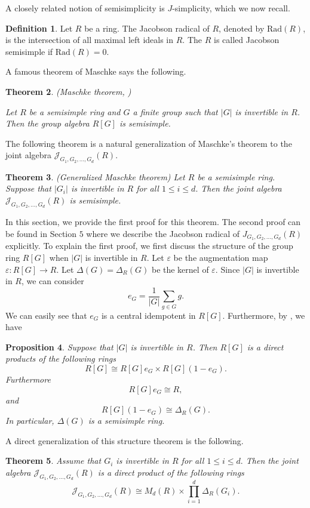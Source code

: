\documentclass[12pt, a4paper]{amsart}
\numberwithin{equation}{section} %
\theoremstyle{plain}
\newtheorem{thm}{Theorem}[section]
\theoremstyle{definition}
\newtheorem{defn}[thm]{Definition}
\theoremstyle{plain}
\newtheorem{prop}[thm]{Proposition}
\theoremstyle{remark}
\newcommand{\sJ}{\mathcal{J}}
\newcommand{\Rad}{\text{Rad}}
\begin{document}
A closely related notion of semisimplicity is $J$-simplicity, which we now recall. 
\begin{defn}
Let $R$ be a ring. The Jacobson radical of $R$, denoted by $\Rad(R)$, is the intersection of all maximal left ideals in $R.$ The $R$ is called Jacobson semisimple if $\Rad(R)=0.$
\end{defn}
A famous theorem of Maschke says the following.
\begin{thm}(Maschke theorem, \cite[Theorem 6.1]{lam}) 

Let $R$ be a semisimple ring and $G$ a finite group such that $|G|$ is invertible in $R$. Then the group algebra $R[G]$ is semisimple. \end{thm}
The following theorem is a natural generalization of Maschke's theorem to the joint algebra $\mathcal{J}_{G_1, G_2, \ldots, G_d}(R)$. 

\begin{thm} (Generalized Maschke theorem) \label{thm:maschke}
Let $R$ be a semisimple ring. Suppose that $|G_i|$ is invertible in $R$ for all $1 \leq i \leq d.$ Then the joint algebra $\sJ_{G_1, G_2, \ldots, G_d}(R)$ is semisimple. 
\end{thm}
{\color{red}In this section, we provide the first proof for this theorem. The 
second proof can be found in Section $5$ where we describe the Jacobson radical of $J_{G_1, G_2, \ldots, G_d}(R)$ explicitly.} 
To explain the first proof, we first discuss the structure of the group ring $R[G]$ when $|G|$ is invertible in $R.$ Let $\varepsilon$ be the augmentation map $\varepsilon: R[G] \to R.$ Let $\Delta(G) =\Delta_{R}(G)$ be the kernel of $\varepsilon.$ Since $|G|$ is invertible in $R$, we can consider 
\[ e_{G}=\frac{1}{|G|} \sum_{g \in G} g .\] 
We can easily see that $e_G$ is a central idempotent in $R[G]$. Furthermore, by \cite[Proposition 3.6.7]{GR}, we have 
\begin{prop} \label{prop:splitting}
Suppose that $|G|$ is invertible in $R$. Then $R[G]$ is a direct products of the following rings 
\[ R[G] \cong R[G]e_G \times R[G](1-e_G) .\] 
Furthermore 
\[ R[G] e_G \cong R, \]
and 
\[ R[G](1-e_G) \cong \Delta_{R}(G) .\] 
In particular, $\Delta(G)$ is a semisimple ring.
\end{prop}

A direct generalization of this structure theorem is the following. 
\begin{thm} \label{thm:decomposition}
Assume that $G_i$ is invertible in $R$ for all $1 \leq i \leq d.$ Then the joint algebra $\sJ_{G_1, G_2, \ldots, G_d}(R)$ is a direct product of the following rings 
\[ \sJ_{G_1, G_2, \ldots, G_d}(R) \cong M_d(R) \times \prod_{i=1}^d \Delta_{R}(G_i) .\] 
\end{thm}
\end{document}
